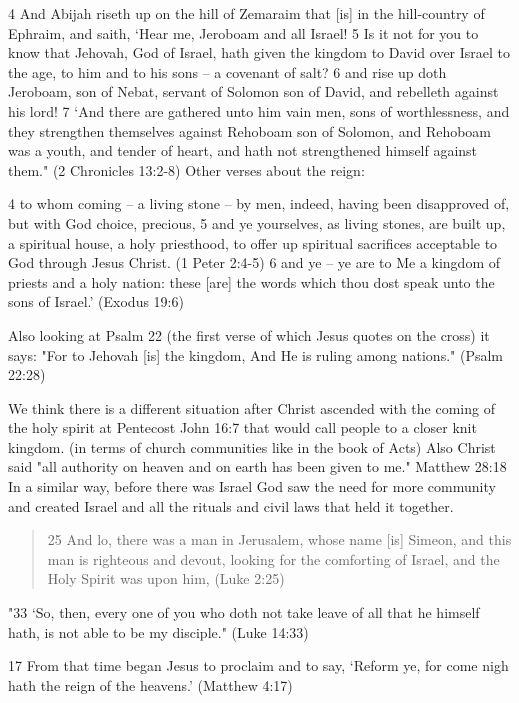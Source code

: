 \documentclass[11pt]{article}
\begin{document}
\begin{thebibliography}{37}
4 And Abijah riseth up on the hill of Zemaraim that [is] in the hill-country of Ephraim, and saith, `Hear me, Jeroboam and all Israel!
5 Is it not for you to know that Jehovah, God of Israel, hath given the kingdom to David over Israel to the age, to him and to his sons -- a covenant of salt?
6 and rise up doth Jeroboam, son of Nebat, servant of Solomon son of David, and rebelleth against his lord!
7 `And there are gathered unto him vain men, sons of worthlessness, and they strengthen themselves against Rehoboam son of Solomon, and Rehoboam was a youth, and tender of heart, and hath not strengthened himself against them." (2 Chronicles 13:2-8)
Other verses about the reign:
 \newline

4 to whom coming -- a living stone -- by men, indeed, having been disapproved of, but with God choice, precious,
5 and ye yourselves, as living stones, are built up, a spiritual house, a holy priesthood, to offer up spiritual sacrifices acceptable to God through Jesus Christ. (1 Peter 2:4-5)
6 and ye -- ye are to Me a kingdom of priests and a holy nation: these [are] the words which thou dost speak unto the sons of Israel.' (Exodus 19:6) 

Also looking at Psalm 22 (the first verse of which Jesus quotes on the cross) it says:
"For to Jehovah [is] the kingdom, And He is ruling among nations." (Psalm 22:28)

We think there is a different situation after Christ ascended with the coming of the holy spirit at Pentecost John 16:7 that would call people to a closer knit kingdom. (in terms of church communities like in the book of Acts) Also Christ said "all authority on heaven and on earth has been given to me." Matthew 28:18 In a similar way, before there was Israel God saw the need for more community and created Israel and all the rituals and civil laws that held it together.
\begin{quote}
25 And lo, there was a man in Jerusalem, whose name [is] Simeon, and this man is righteous and devout, looking for the comforting of Israel, and the Holy Spirit was upon him, (Luke 2:25)
\end{quote}


"33 `So, then, every one of you who doth not take leave of all that he himself hath, is not able to be my disciple."  (Luke 14:33)

17 From that time began Jesus to proclaim and to say, `Reform ye, for come nigh hath the reign of the heavens.'
(Matthew 4:17)


\end{thebibliography}
\end{document}
